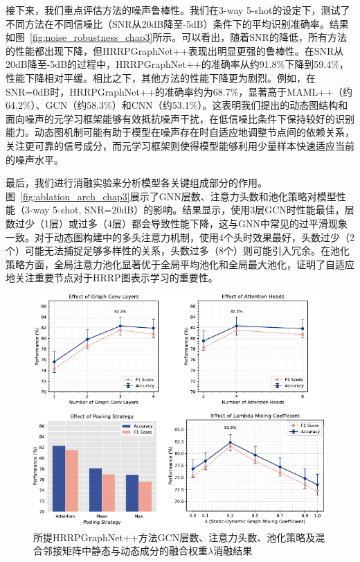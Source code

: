 接下来，我们重点评估方法的噪声鲁棒性。我们在3-way 5-shot的设定下，测试了不同方法在不同信噪比（SNR从20dB降至-5dB）条件下的平均识别准确率。结果如图~\ref{fig:noise_robustness_chap3}所示。可以看出，随着SNR的降低，所有方法的性能都出现下降，但HRRPGraphNet++表现出明显更强的鲁棒性。在SNR从20dB降至-5dB的过程中，HRRPGraphNet++的准确率从约91.8\%下降到59.4\%，性能下降相对平缓。相比之下，其他方法的性能下降更为剧烈。例如，在SNR=0dB时，HRRPGraphNet++的准确率约为68.7\%，显著高于MAML++（约64.2\%）、GCN（约58.3\%）和CNN（约53.1\%）。这表明我们提出的动态图结构和面向噪声的元学习框架能够有效抵抗噪声干扰，在低信噪比条件下保持较好的识别能力。动态图机制可能有助于模型在噪声存在时自适应地调整节点间的依赖关系，关注更可靠的信号成分，而元学习框架则使得模型能够利用少量样本快速适应当前的噪声水平。

最后，我们进行消融实验来分析模型各关键组成部分的作用。图~\ref{fig:ablation_arch_chap3}展示了GNN层数、注意力头数和池化策略对模型性能（3-way 5-shot, SNR=20dB）的影响。结果显示，使用3层GCN时性能最佳，层数过少（1层）或过多（4层）都会导致性能下降，这与GNN中常见的过平滑现象一致。对于动态图构建中的多头注意力机制，使用4个头时效果最好，头数过少（2个）可能无法捕捉足够多样性的关系，头数过多（8个）则可能引入冗余。在池化策略方面，全局注意力池化显著优于全局平均池化和全局最大池化，证明了自适应地关注重要节点对于HRRP图表示学习的重要性。

\begin{figure}[h]
    \centering
    \includegraphics[width=0.95\linewidth]{figures/abla.pdf} %
    \caption{所提HRRPGraphNet++方法GCN层数、注意力头数、池化策略及混合邻接矩阵中静态与动态成分的融合权重$\lambda$消融结果}
    \label{fig:abla}
\end{figure}

